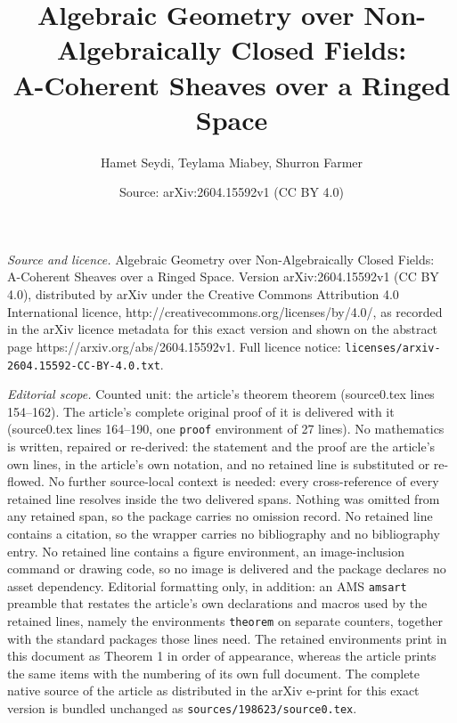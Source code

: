 \documentclass[10pt,a4paper]{amsart}
\title{Algebraic Geometry over Non-Algebraically Closed Fields:\\ A-Coherent Sheaves over a Ringed Space}
\author{Hamet Seydi, Teylama Miabey, Shurron Farmer}
\date{Source: arXiv:2604.15592v1 (CC BY 4.0)}
\begin{document}
\maketitle

\noindent\emph{Source and licence.} Algebraic Geometry over Non-Algebraically Closed Fields:\\ A-Coherent Sheaves over a Ringed Space. Version arXiv:2604.15592v1 (CC BY 4.0), distributed by arXiv under the Creative Commons Attribution 4.0 International licence, http://creativecommons.org/licenses/by/4.0/, as recorded in the arXiv licence metadata for this exact version and shown on the abstract page https://arxiv.org/abs/2604.15592v1. Full licence notice: \texttt{licenses/arxiv-2604.15592-CC-BY-4.0.txt}.\par\smallskip

\noindent\textit{Editorial scope.} Counted unit: the article's theorem theorem (source0.tex lines 154--162). The article's complete original proof of it is delivered with it (source0.tex lines 164--190, one \texttt{proof} environment of 27 lines). No mathematics is written, repaired or re-derived: the statement and the proof are the article's own lines, in the article's own notation, and no retained line is substituted or re-flowed.  No further source-local context is needed: every cross-reference of every retained line resolves inside the two delivered spans.  Nothing was omitted from any retained span, so the package carries no omission record.  No retained line contains a citation, so the wrapper carries no bibliography and no bibliography entry.  No retained line contains a figure environment, an image-inclusion command or drawing code, so no image is delivered and the package declares no asset dependency.  Editorial formatting only, in addition: an AMS \texttt{amsart} preamble that restates the article's own declarations and macros used by the retained lines, namely the environments \texttt{theorem} on separate counters, together with the standard packages those lines need.  The retained environments print in this document as Theorem 1 in order of appearance, whereas the article prints the same items with the numbering of its own full document.  The complete native source of the article as distributed in the arXiv e-print for this exact version is bundled unchanged as \texttt{sources/198623/source0.tex}.
\end{document}
